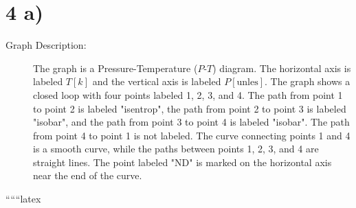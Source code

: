 \section*{4 a)}

\begin{description}
    \item[Graph Description:] The graph is a Pressure-Temperature ($P$-$T$) diagram. The horizontal axis is labeled $T [k]$ and the vertical axis is labeled $P [\text{unles}]$. The graph shows a closed loop with four points labeled 1, 2, 3, and 4. The path from point 1 to point 2 is labeled "isentrop", the path from point 2 to point 3 is labeled "isobar", and the path from point 3 to point 4 is labeled "isobar". The path from point 4 to point 1 is not labeled. The curve connecting points 1 and 4 is a smooth curve, while the paths between points 1, 2, 3, and 4 are straight lines. The point labeled "ND" is marked on the horizontal axis near the end of the curve.
\end{description}

``````latex